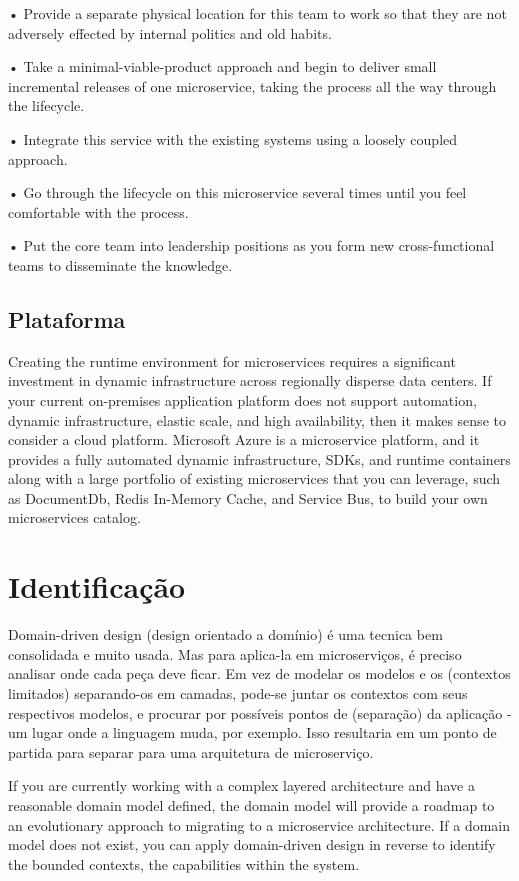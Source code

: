 •	 Provide a separate physical location for this team to work so that they are not adversely effected by internal politics and old habits.

•	 Take a minimal-viable-product approach and begin to deliver small incremental releases of one microservice, taking the process all the way through the lifecycle.

•	 Integrate this service with the existing systems using a loosely coupled approach.

•	 Go through the lifecycle on this microservice several times until you feel comfortable with the process.

•	 Put the core team into leadership positions as you form new cross-functional teams to disseminate the knowledge.

\subsection{Plataforma}

Creating the runtime environment for microservices requires a significant investment in dynamic infrastructure across regionally disperse data centers. If your current on-premises application platform does not support automation, dynamic infrastructure, elastic scale, and high availability, then it makes sense to consider a cloud platform. Microsoft Azure is a microservice platform, and it provides a fully automated dynamic infrastructure, SDKs, and runtime containers along with a large portfolio of existing microservices that you can leverage, such as DocumentDb, Redis In-Memory Cache, and Service Bus, to build your own microservices catalog.

\section{Identificação}

Domain-driven design (design orientado a domínio) é uma tecnica bem consolidada e muito usada. Mas para aplica-la em microserviços, é preciso analisar onde cada peça deve ficar. Em vez de modelar os modelos e os (contextos limitados) separando-os em camadas, pode-se juntar os contextos com seus respectivos modelos, e procurar por possíveis pontos de (separação) da aplicação - um lugar onde a linguagem muda, por exemplo. Isso resultaria em um ponto de partida para separar para uma arquitetura de microserviço.

If you are currently working with a complex layered architecture and have a reasonable domain model defined, the domain model will provide a roadmap to an evolutionary approach to migrating to a microservice architecture. If a domain model does not exist, you can apply domain-driven design in reverse to identify the bounded contexts, the capabilities within the system.

